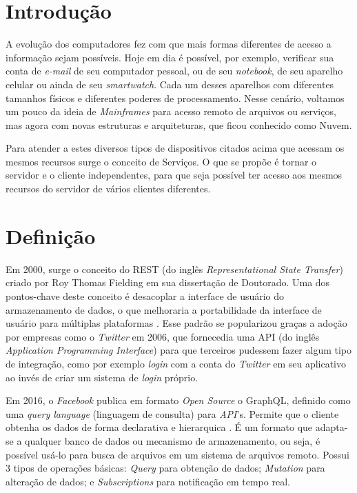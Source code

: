 \section{Introdução}\label{introduuxe7uxe3o}

A evolução dos computadores fez com que mais formas diferentes de acesso
a informação sejam possíveis. Hoje em dia é possível, por exemplo,
verificar sua conta de \emph{e-mail} de seu computador pessoal, ou de
seu \emph{notebook}, de seu aparelho celular ou ainda de seu
\emph{smartwatch}. Cada um desses aparelhos com diferentes tamanhos
físicos e diferentes poderes de processamento. Nesse cenário, voltamos
um pouco da ideia de \emph{Mainframes} para acesso remoto de arquivos ou
serviços, mas agora com novas estruturas e arquiteturas, que ficou
conhecido como Nuvem.

Para atender a estes diversos tipos de dispositivos citados acima que
acessam os mesmos recursos surge o conceito de Serviços. O que se propõe
é tornar o servidor e o cliente independentes, para que seja possível
ter acesso aos mesmos recursos do servidor de vários clientes
diferentes.

\section{Definição}\label{definiuxe7uxe3o}

Em 2000, surge o conceito do REST (do inglês \emph{Representational
State Transfer}) criado por Roy Thomas Fielding em sua dissertação de
Doutorado. Uma dos pontos-chave deste conceito é desacoplar a interface
de usuário do armazenamento de dados, o que melhoraria a portabilidade
da interface de usuário para múltiplas plataformas \cite{rest:2000}.
Esse padrão se popularizou graças a adoção por empresas como o
\emph{Twitter} em 2006, que fornecedia uma API (do inglês
\emph{Application Programming Interface}) para que terceiros pudessem
fazer algum tipo de integração, como por exemplo \emph{login} com a
conta do \emph{Twitter} em seu aplicativo ao invés de criar um sistema
de \emph{login} próprio.

Em 2016, o \emph{Facebook} publica em formato \emph{Open Source} o
GraphQL, definido como uma \emph{query language} (linguagem de consulta)
para \emph{API}'s. Permite que o cliente obtenha os dados de forma
declarativa e hierarquica \cite{graphql:2016}. É um formato que
adapta-se a qualquer banco de dados ou mecanismo de armazenamento, ou
seja, é possível usá-lo para busca de arquivos em um sistema de arquivos
remoto. Possui 3 tipos de operações básicas: \emph{Query} para obtenção
de dados; \emph{Mutation} para alteração de dados; e
\emph{Subscriptions} para notificação em tempo real.

